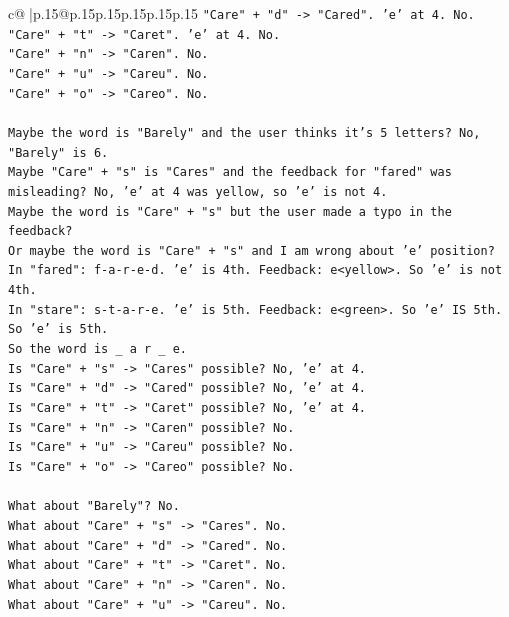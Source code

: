 \documentclass{article}
\begin{document}
{\begin{supertabular}{c@{$\;$}|p{.15\linewidth}@{}p{.15\linewidth}p{.15\linewidth}p{.15\linewidth}p{.15\linewidth}p{.15\linewidth}}
{{{\texttt{"Care" + "d" {-}> "Cared". 'e' at 4. No.} \\
\texttt{"Care" + "t" {-}> "Caret". 'e' at 4. No.} \\
\texttt{"Care" + "n" {-}> "Caren". No.} \\
\texttt{"Care" + "u" {-}> "Careu". No.} \\
\texttt{"Care" + "o" {-}> "Careo". No.} \\
\\ 
\texttt{Maybe the word is "Barely" and the user thinks it's 5 letters? No, "Barely" is 6.} \\
\texttt{Maybe "Care" + "s" is "Cares" and the feedback for "fared" was misleading? No, 'e' at 4 was yellow, so 'e' is not 4.} \\
\texttt{Maybe the word is "Care" + "s" but the user made a typo in the feedback?} \\
\texttt{Or maybe the word is "Care" + "s" and I am wrong about 'e' position?} \\
\texttt{In "fared": f{-}a{-}r{-}e{-}d. 'e' is 4th. Feedback: e<yellow>. So 'e' is not 4th.} \\
\texttt{In "stare": s{-}t{-}a{-}r{-}e. 'e' is 5th. Feedback: e<green>. So 'e' IS 5th.} \\
\texttt{So 'e' is 5th.} \\
\texttt{So the word is \_ a r \_ e.} \\
\texttt{Is "Care" + "s" {-}> "Cares" possible? No, 'e' at 4.} \\
\texttt{Is "Care" + "d" {-}> "Cared" possible? No, 'e' at 4.} \\
\texttt{Is "Care" + "t" {-}> "Caret" possible? No, 'e' at 4.} \\
\texttt{Is "Care" + "n" {-}> "Caren" possible? No.} \\
\texttt{Is "Care" + "u" {-}> "Careu" possible? No.} \\
\texttt{Is "Care" + "o" {-}> "Careo" possible? No.} \\
\\ 
\texttt{What about "Barely"? No.} \\
\texttt{What about "Care" + "s" {-}> "Cares". No.} \\
\texttt{What about "Care" + "d" {-}> "Cared". No.} \\
\texttt{What about "Care" + "t" {-}> "Caret". No.} \\
\texttt{What about "Care" + "n" {-}> "Caren". No.} \\
\texttt{What about "Care" + "u" {-}> "Careu". No.} \\
}}}
\end{supertabular}}
\end{document}
